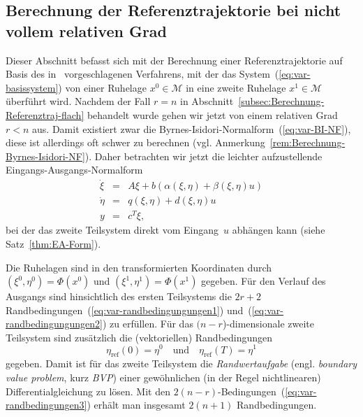 \subsection{Berechnung der Referenztrajektorie bei nicht vollem relativen Grad\label{subsec:Berechnung-Referenztraj-randwert}}

Dieser Abschnitt befasst sich mit der Berechnung einer Referenztrajektorie
auf Basis des in~\cite{graichen2005,graichen2005ecc,graichen2006at}
vorgeschlagenen Verfahrens, mit der das System~(\ref{eq:var-basissystem})
von einer Ruhelage $x^{0}\in\mathcal{M}$ in eine zweite Ruhelage
$x^{1}\in\mathcal{M}$ überführt wird. Nachdem der Fall $r=n$ in
Abschnitt~\ref{subsec:Berechnung-Referenztraj-flach} behandelt wurde
gehen wir jetzt von einem relativen Grad $r<n$ aus. Damit existiert
zwar die Byrnes-Isidori-Normalform~(\ref{eq:var-BI-NF}), diese ist
allerdings oft schwer zu berechnen (vgl. Anmerkung~\ref{rem:Berechnung-Byrnes-Isidori-NF}).
Daher betrachten wir jetzt die leichter aufzustellende Eingangs-Ausgangs-Normalform
\begin{equation}
\begin{array}{rcl}
\dot{\xi} & = & A\xi+b(\alpha(\xi,\eta)+\beta(\xi,\eta)u)\\
\dot{\eta} & = & q(\xi,\eta)+d(\xi,\eta)u\\
y & = & c^{T}\xi,
\end{array}\label{eq:var-EA-NF}
\end{equation}
bei der das zweite Teilsystem direkt vom Eingang~$u$ abhängen kann
(siehe Satz~\ref{thm:EA-Form}). 

Die Ruhelagen sind in den transformierten Koordinaten durch $(\xi^{0},\eta^{0})=\Phi(x^{0})$
und $(\xi^{1},\eta^{1})=\Phi(x^{1})$ gegeben. Für den Verlauf des
Ausgangs sind hinsichtlich des ersten Teilsystems die $2r+2$ Randbedingungen~(\ref{eq:var-randbedingungungen1})
und~(\ref{eq:var-randbedingungungen2}) zu erfüllen. Für das $(n-r$)-dimensionale
zweite Teilsystem sind zusätzlich die (vektoriellen) Randbedingungen
\begin{equation}
\eta_{\text{ref}}(0)=\eta^{0}\quad\text{und}\quad\eta_{\text{ref}}(T)=\eta^{1}\label{eq:var-randbedingungen3}
\end{equation}
gegeben. Damit ist für das zweite Teilsystem die \emph{Randwertaufgabe}
(engl. \emph{boundary value problem}, kurz \emph{BVP}) einer gewöhnlichen
(in der Regel nichtlinearen) Differentialgleichung zu lösen. Mit den
$2(n-r)$-Bedingungen~(\ref{eq:var-randbedingungen3}) erhält man
insgesamt $2(n+1)$ Randbedingungen.

